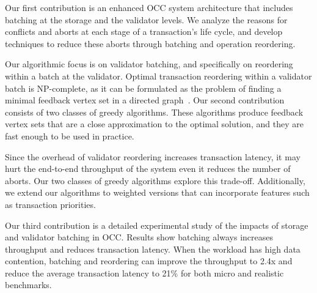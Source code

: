 Our first contribution is an enhanced OCC system architecture that includes batching at the storage and the validator levels. We analyze the reasons for conflicts and aborts at each stage of a transaction's life cycle, and develop techniques to reduce these aborts through batching and operation reordering.

Our algorithmic focus is on validator batching, and specifically on reordering within a batch at the validator. Optimal transaction reordering within a validator batch is NP-complete, as it can be formulated as the problem of finding a minimal feedback vertex set in a directed graph~\cite{karp1972reducibility}. Our second contribution consists of two classes of greedy algorithms. These algorithms produce feedback vertex sets that are a close approximation to the optimal solution, and they are fast enough to be used in practice. 


Since the overhead of validator reordering increases transaction latency, it may hurt the end-to-end throughput of the system even it reduces the number of aborts. Our two classes of greedy algorithms explore this trade-off. Additionally, we extend our algorithms to weighted versions that can incorporate features such as transaction priorities.



Our third contribution is a detailed experimental study of the impacts of storage and validator batching in OCC. Results show batching always increases throughput and reduces transaction latency. When the workload has high data contention, batching and reordering can improve the throughput to 2.4x and reduce the average transaction latency to 21\% for both micro and realistic benchmarks.

